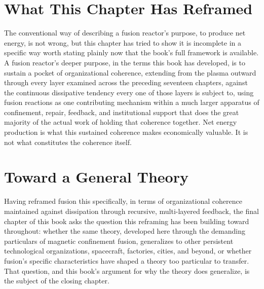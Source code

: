 \section{What This Chapter Has Reframed}

The conventional way of describing a fusion reactor's purpose, to produce net energy, is not wrong, but this chapter has tried to show it is incomplete in a specific way worth stating plainly now that the book's full framework is available. A fusion reactor's deeper purpose, in the terms this book has developed, is to sustain a pocket of organizational coherence, extending from the plasma outward through every layer examined across the preceding seventeen chapters, against the continuous dissipative tendency every one of those layers is subject to, using fusion reactions as one contributing mechanism within a much larger apparatus of confinement, repair, feedback, and institutional support that does the great majority of the actual work of holding that coherence together. Net energy production is what this sustained coherence makes economically valuable. It is not what constitutes the coherence itself.

\section{Toward a General Theory}

Having reframed fusion this specifically, in terms of organizational coherence maintained against dissipation through recursive, multi-layered feedback, the final chapter of this book asks the question this reframing has been building toward throughout: whether the same theory, developed here through the demanding particulars of magnetic confinement fusion, generalizes to other persistent technological organizations, spacecraft, factories, cities, and beyond, or whether fusion's specific characteristics have shaped a theory too particular to transfer. That question, and this book's argument for why the theory does generalize, is the subject of the closing chapter.
